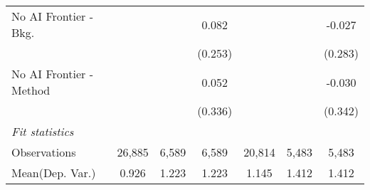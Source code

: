 \begin{tabular}{lcccccc}
   No AI Frontier - Bkg.   &         &         & 0.082   &               &         & -0.027\\   
                           &         &         & (0.253) &               &         & (0.283)\\   
   No AI Frontier - Method &         &         & 0.052   &               &         & -0.030\\   
                           &         &         & (0.336) &               &         & (0.342)\\   
   \midrule
   \emph{Fit statistics}\\
   Observations            & 26,885  & 6,589   & 6,589   & 20,814        & 5,483   & 5,483\\  
Mean(Dep. Var.) & 0.926 & 1.223 & 1.223 & 1.145 & 1.412 & 1.412 \\
   

\end{tabular}

